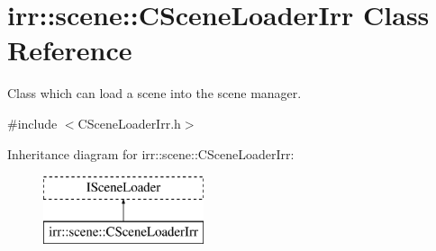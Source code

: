 \hypertarget{classirr_1_1scene_1_1_c_scene_loader_irr}{\section{irr\-:\-:scene\-:\-:C\-Scene\-Loader\-Irr Class Reference}
\label{classirr_1_1scene_1_1_c_scene_loader_irr}
}


Class which can load a scene into the scene manager.  




{\ttfamily \#include $<$C\-Scene\-Loader\-Irr.\-h$>$}

Inheritance diagram for irr\-:\-:scene\-:\-:C\-Scene\-Loader\-Irr\-:\begin{figure}[H]
\begin{center}
\leavevmode
\includegraphics[height=2.000000cm]{classirr_1_1scene_1_1_c_scene_loader_irr}
\end{center}
\end{figure}
